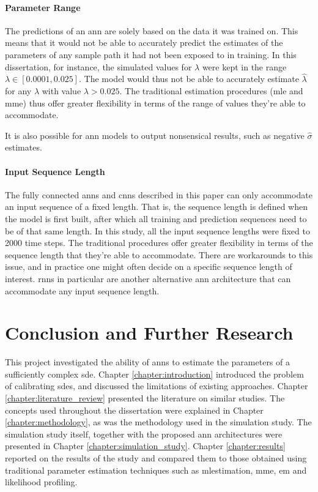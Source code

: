 \documentclass[11pt,oneside,openany,a4paper,english, report, goldenblock
]{usthesis}
\begin{document}
\subsubsection{Parameter Range}

The predictions of an \acrshort{ann} are solely based on the data it was trained on. This means that it would not be able to accurately predict the estimates of the parameters of any sample path it had not been exposed to in training. In this dissertation, for instance, the simulated values for $\lambda$ were kept in the range $\lambda\in [0.0001, 0.025]$. The model would thus not be able to accurately estimate $\hat{\lambda}$ for any $\lambda$ with value $\lambda > 0.025$. The traditional estimation procedures (\acrshort{mle} and \acrshort{mme}) thus offer greater flexibility in terms of the range of values they're able to accommodate.

It is also possible for \acrshort{ann} models to output nonsensical results, such as negative $\hat{\sigma}$ estimates.  

\subsubsection{Input Sequence Length}

The fully connected \acrshort{ann}s and \acrshort{cnn}s described in this paper can only accommodate an input sequence of a fixed length. That is, the sequence length is defined when the model is first built, after which all training and prediction sequences need to be of that same length. In this study, all the input sequence lengths were fixed to 2000 time steps. The  traditional procedures offer greater flexibility in terms of the sequence length that they're able to accommodate. There are workarounds to this issue, and in practice one might often decide on a specific sequence length of interest. \acrshort{rnn}s in particular are another alternative \acrshort{ann} architecture that can accommodate any input sequence length.

\chapter{Conclusion and Further Research}

This project investigated the ability of \acrshort{ann}s to estimate the parameters of a sufficiently complex \acrshort{sde}. Chapter \ref{chapter:introduction} introduced the problem of calibrating \acrshort{sde}s, and discussed the limitations of existing approaches. Chapter \ref{chapter:literature_review} presented the literature on similar studies. The concepts used throughout the dissertation were explained in Chapter \ref{chapter:methodology}, as was the methodology used in the simulation study. The simulation study itself, together with the proposed \acrshort{ann} architectures were presented in Chapter \ref{chapter:simulation_study}. Chapter \ref{chapter:results} reported on the results of the study and compared them to those obtained using traditional parameter estimation techniques such as \acrshort{mlestimation}, \acrshort{mme}, \acrshort{em} and likelihood profiling.
\end{document}
